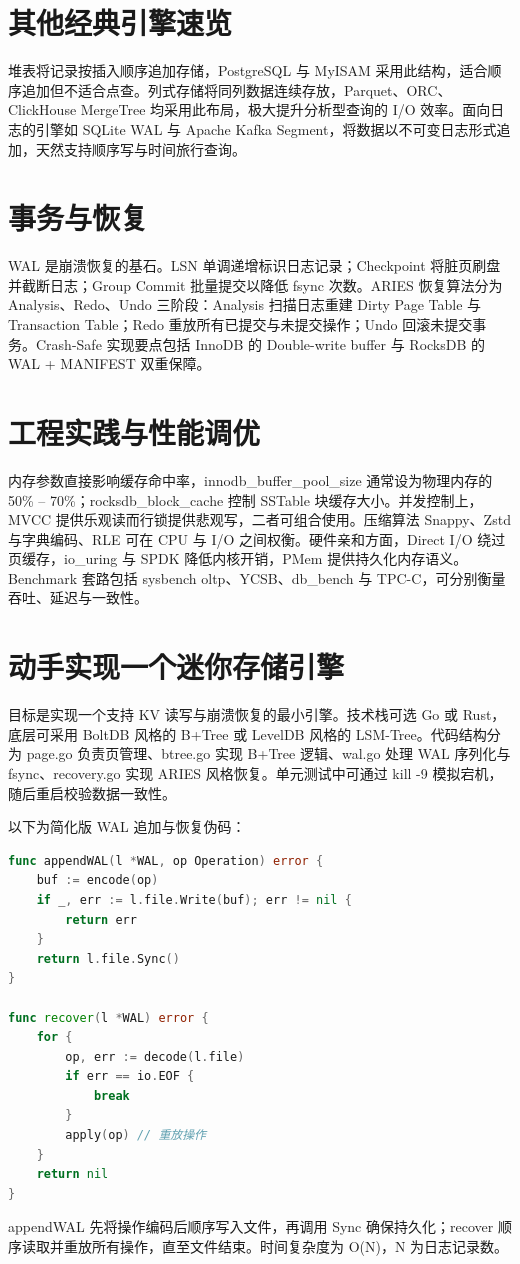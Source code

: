 \chapter{其他经典引擎速览}
堆表将记录按插入顺序追加存储，PostgreSQL 与 MyISAM 采用此结构，适合顺序追加但不适合点查。列式存储将同列数据连续存放，Parquet、ORC、ClickHouse MergeTree 均采用此布局，极大提升分析型查询的 I/O 效率。面向日志的引擎如 SQLite WAL 与 Apache Kafka Segment，将数据以不可变日志形式追加，天然支持顺序写与时间旅行查询。\par
\chapter{事务与恢复}
WAL 是崩溃恢复的基石。LSN 单调递增标识日志记录；Checkpoint 将脏页刷盘并截断日志；Group Commit 批量提交以降低 fsync 次数。ARIES 恢复算法分为 Analysis、Redo、Undo 三阶段：Analysis 扫描日志重建 Dirty Page Table 与 Transaction Table；Redo 重放所有已提交与未提交操作；Undo 回滚未提交事务。Crash-Safe 实现要点包括 InnoDB 的 Double-write buffer 与 RocksDB 的 WAL + MANIFEST 双重保障。\par
\chapter{工程实践与性能调优}
内存参数直接影响缓存命中率，innodb\_{}buffer\_{}pool\_{}size 通常设为物理内存的 50\%{} – 70\%{}；rocksdb\_{}block\_{}cache 控制 SSTable 块缓存大小。并发控制上，MVCC 提供乐观读而行锁提供悲观写，二者可组合使用。压缩算法 Snappy、Zstd 与字典编码、RLE 可在 CPU 与 I/O 之间权衡。硬件亲和方面，Direct I/O 绕过页缓存，io\_{}uring 与 SPDK 降低内核开销，PMem 提供持久化内存语义。Benchmark 套路包括 sysbench oltp、YCSB、db\_{}bench 与 TPC-C，可分别衡量吞吐、延迟与一致性。\par
\chapter{动手实现一个迷你存储引擎}
目标是实现一个支持 KV 读写与崩溃恢复的最小引擎。技术栈可选 Go 或 Rust，底层可采用 BoltDB 风格的 B+Tree 或 LevelDB 风格的 LSM-Tree。代码结构分为 page.go 负责页管理、btree.go 实现 B+Tree 逻辑、wal.go 处理 WAL 序列化与 fsync、recovery.go 实现 ARIES 风格恢复。单元测试中可通过 kill -9 模拟宕机，随后重启校验数据一致性。\par
以下为简化版 WAL 追加与恢复伪码：\par
\begin{lstlisting}[language=go]
func appendWAL(l *WAL, op Operation) error {
    buf := encode(op)
    if _, err := l.file.Write(buf); err != nil {
        return err
    }
    return l.file.Sync()
}

func recover(l *WAL) error {
    for {
        op, err := decode(l.file)
        if err == io.EOF {
            break
        }
        apply(op) // 重放操作
    }
    return nil
}
\end{lstlisting}
appendWAL 先将操作编码后顺序写入文件，再调用 Sync 确保持久化；recover 顺序读取并重放所有操作，直至文件结束。时间复杂度为 O(N)，N 为日志记录数。\par
